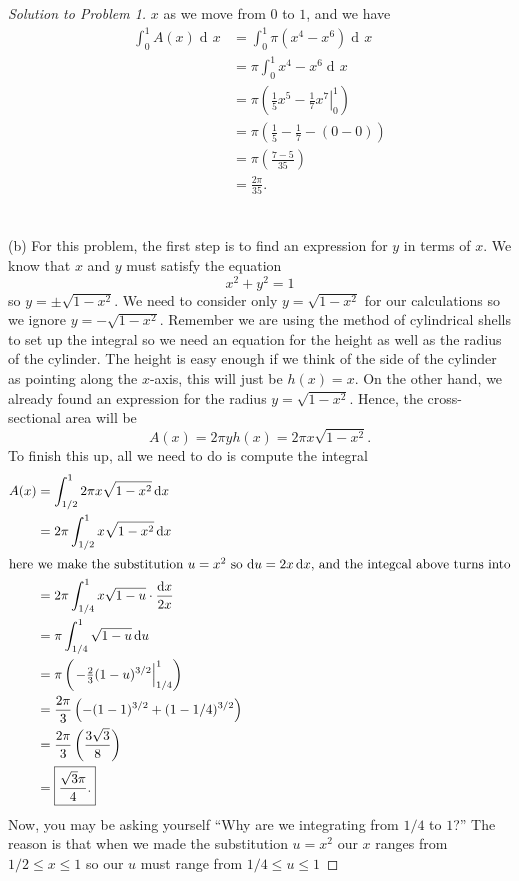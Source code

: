 \documentclass[12pt]{article}
\theoremstyle{plain}
\theoremstyle{definition}
\theoremstyle{remark}
\DeclareMathOperator{\diff}{d\!}
\begin{document}
\begin{proof}[Solution to Problem 1]
$x$ as we move from $0$ to $1$, and we have
\begin{align*}
\int_0^1 A(x)\diff x
&=\int_0^1 \pi\left(x^4-x^6\right)\diff x\\
&=\pi\int_0^1 x^4-x^6\diff x\\
&=\pi\left(\left.\tfrac{1}{5}x^5-\tfrac{1}{7}x^7\right|_0^1\right)\\
&=\pi\left(\frac{1}{5}-\frac{1}{7}-(0-0)\right)\\
&=\pi\left(\frac{7-5}{35}\right)\\
&=\boxed{\frac{2\pi}{35}.}
\end{align*}
\\\\
(b) For this problem, the first step is to find an expression for $y$ in
terms of $x$. We know that $x$ and $y$ must satisfy the equation
\[
x^2+y^2=1
\]
so $y=\pm\sqrt{1-x^2}$. We need to consider only $y=\sqrt{1-x^2}$ for our
calculations so we ignore $y=-\sqrt{1-x^2}$. Remember we are using the
method of cylindrical shells to set up the integral so we need an equation
for the height as well as the radius of the cylinder. The height is easy
enough if we think of the side of the cylinder as pointing along the
$x$-axis, this will just be $h(x)=x$. On the other hand, we already found
an expression for the radius $y=\sqrt{1-x^2}$. Hence, the cross-sectional
area will be
\[
A(x)=2\pi y h(x)=2\pi x\sqrt{1-x^2}.
\]
To finish this up, all we need
to do is compute the integral
\begin{align*}
A(x)&=\int_{1/2}^1 2\pi x\sqrt{1-x^2}\diff x\\
    &=2\pi\int_{1/2}^1 x\sqrt{1-x^2}\diff x\\
\shortintertext{here we make the substitution $u=x^2$ so $\diff u=2x\diff
  x$, and the integcal above turns into}
&=2\pi\int_{1/4}^1 x\sqrt{1-u}\cdot \frac{\diff x}{2x}\\
&=\pi\int_{1/4}^1 \sqrt{1-u}\diff u\\
&=\pi\left(\left.-\tfrac{2}{3}(1-u)^{3/2}\right|_{1/4}^1 \right)\\
&=\frac{2\pi}{3}\left(-(1-1)^{3/2}+(1-1/4)^{3/2}\right)\\
&=\frac{2\pi}{3}\left(\frac{3\sqrt{3}}{8}\right)\\
&=\boxed{\frac{\sqrt{3}\pi}{4}.}
\end{align*}
Now, you may be asking yourself ``Why are we integrating from $1/4$ to
$1$?'' The reason is that when we made the substitution $u=x^2$ our $x$
ranges from $1/2\leq x\leq 1$ so our $u$ must range from $1/4\leq u\leq 1$

\end{proof}
\end{document}
